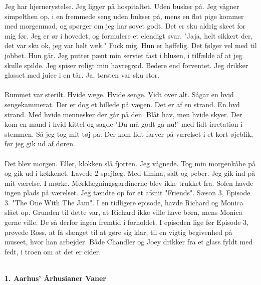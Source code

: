 \documentclass[]{article}
\begin{document}
Jeg har hjernerystelse. Jeg ligger på hospitaltet. Uden busker på. Jeg vågner simpelthen op, i en fremmede seng uden bukser på, mens en flot pige kommer med morgenmad, og spørger om jeg har sovet godt. Det er sku aldrig skeet for mig før. Jeg er ør i hovedet, og formulere et elendigt svar. "Jaja, helt sikkert der, det var sku ok, jeg var helt væk." Fuck mig. Hun er høffelig. Det følger vel med til jobbet. Hun går. Jeg putter pænt min serviet fast i blusen, i tilfælde af at jeg skulle spilde. Jeg spiser roligt min havregrød. Bedere end forventet. Jeg drikker glasset med juice i en tår. Ja, tørsten var sku stor.
\\ \\
Rummet var sterilt. Hvide væge. Hvide senge. Vidt over alt. Sågar en hvid sengekammerat. Der er dog et billede på vægen. Det er af en strand. En hvd strand. Med hvide mennesker der går på den. Blåt hav, men hvide skyer. Der kom en mand i hvid kittel og sagde "Du må godt gå nu!" med lidt irretation i stemmen. Så jeg tog mit tøj på. Der kom lidt farver på værelset i et kort øjeblik, før jeg gik ud af døren.
\\ \\
Det blev morgen. Eller, klokken slå fjorten. Jeg vågnede. Tog min morgenkåbe på og gik ud i køkkenet. Lavede 2 spejlæg. Med timina, salt og peber. Jeg gik ind på mit værelse. I mørke. Mørklægningsgardinerne blev ikke trukket fra. Solen havde ingen plads på værelset. Jeg tændte op for et afsnit "Friends". Sæson 3, Episode 3. "The One With The Jam". I en tidligere episode, havde Richard og Monica slået op. Grunden til dette var, at Richard ikke ville have børn, mens Monica gerne ville. De så derfor ingen fremtid i forholdet. I episoden lige før Episode 3, prøvede Ross, at få slænget til at gøre sig klar, til en vigtig begivenhed på museet, hvor han arbejder. Både Chandler og Joey drikker fra et glass fyldt med fedt, i troen om at det er cider.
\\ \\





\begin{center}
	\large\textbf{1. Aarhus' Århusianer Vaner}
\end{center}
\end{document}
